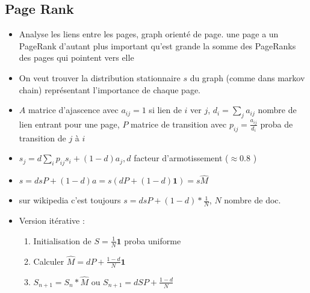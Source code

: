 \documentclass{article}
\begin{document}
\begin{multicols}{2}
\section{Page Rank}
\begin{itemize}
    \item Analyse les liens entre les pages, graph orienté de page. une page a un PageRank d'autant plus important qu'est grande la somme des PageRanks des pages qui pointent vers elle
    \item On veut trouver la distribution stationnaire $ s $ du graph (comme dans markov chain) représentant l'importance de chaque page.
    \item $ A $ matrice d'ajascence avec $ a_{ij} = 1$ si lien de $ i $ ver $ j $, $ d_i = \sum_{j}^{} a_{ij} $ nombre de lien entrant pour une page, $ P $ matrice de transition avec $ p_{ij} = \frac{a_{ij}}{d_i}$ proba de transition de $ j $ à $ i $ 
    \item $ s_j = d \sum_{i}^{}p_{ij} s_i + (1 - d) a_j, d$ facteur d'armotissement ($ \approx 0.8 $ )
    \item $ s = dsP + (1-d)a  = s (d P + (1 - d) \mathbf{1}) = s \hat{M}$ 
    \item sur wikipedia c'est toujours $ s = dsP + (1-d)* \frac{1}{N} $, $ N $ nombre de doc.
    \item Version itérative : \begin{enumerate}
        \item Initialisation de $ S = \frac{1}{N} \mathbf{1} $ proba uniforme
        \item Calculer $ \hat{M} = dP + \frac{1-d}{N} \mathbf{1} $ 
        \item $ S_{n+1} = S_n * \hat{M} $ ou $ S_{n+1} = d SP + \frac{1- d}{N} $  
    \end{enumerate}
\end{itemize}


\end{multicols}
\end{document}
